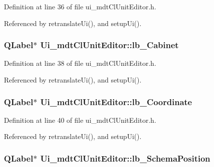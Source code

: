 Definition at line 36 of file ui\-\_\-mdt\-Cl\-Unit\-Editor.\-h.



Referenced by retranslate\-Ui(), and setup\-Ui().

\hypertarget{class_ui__mdt_cl_unit_editor_a2a0a6f77f6300153283dca24177c0f02}{
\subsubsection[{lb\-\_\-\-Cabinet}]{\setlength{\rightskip}{0pt plus 5cm}Q\-Label$\ast$ Ui\-\_\-mdt\-Cl\-Unit\-Editor\-::lb\-\_\-\-Cabinet}}\label{class_ui__mdt_cl_unit_editor_a2a0a6f77f6300153283dca24177c0f02}


Definition at line 38 of file ui\-\_\-mdt\-Cl\-Unit\-Editor.\-h.



Referenced by retranslate\-Ui(), and setup\-Ui().

\hypertarget{class_ui__mdt_cl_unit_editor_acd3da5c66f1506ed88b2ea3e36deac66}{
\subsubsection[{lb\-\_\-\-Coordinate}]{\setlength{\rightskip}{0pt plus 5cm}Q\-Label$\ast$ Ui\-\_\-mdt\-Cl\-Unit\-Editor\-::lb\-\_\-\-Coordinate}}\label{class_ui__mdt_cl_unit_editor_acd3da5c66f1506ed88b2ea3e36deac66}


Definition at line 40 of file ui\-\_\-mdt\-Cl\-Unit\-Editor.\-h.



Referenced by retranslate\-Ui(), and setup\-Ui().

\hypertarget{class_ui__mdt_cl_unit_editor_acb999cbdc305fc0781a8eb2d9568e2db}{
\subsubsection[{lb\-\_\-\-Schema\-Position}]{\setlength{\rightskip}{0pt plus 5cm}Q\-Label$\ast$ Ui\-\_\-mdt\-Cl\-Unit\-Editor\-::lb\-\_\-\-Schema\-Position}}\label{class_ui__mdt_cl_unit_editor_acb999cbdc305fc0781a8eb2d9568e2db}


